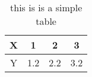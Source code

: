 \begin{table}[h!]
\centering
\begin{tabular}
{| c | c | c | c |}
\hline
 X & 1 & 2 & 3 \\ 
\hline
 Y & 1.2 & 2.2 & 3.2 \\ 
\hline
\end{tabular}
\label{SimpleTable}
\caption{this is is a simple table}
\end{table}
